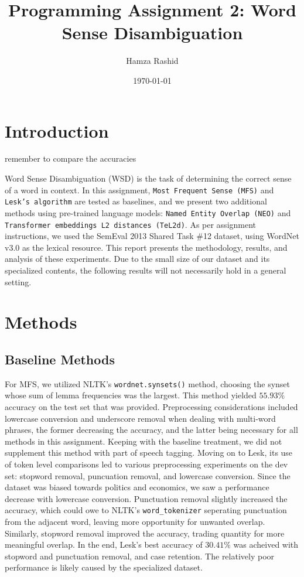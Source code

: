 \documentclass[11pt]{article}
\title{Programming Assignment 2: Word Sense Disambiguation}
\author{Hamza Rashid}
\date{\today}
\begin{document}
\maketitle

\section{Introduction}
remember to compare the accuracies

Word Sense Disambiguation (WSD) is the task of determining the correct sense of a word in context. 
In this assignment, \texttt{Most Frequent Sense (MFS)} and \texttt{Lesk’s algorithm} are tested as baselines, and we present
two additional methods using pre-trained language models: \texttt{Named Entity Overlap (NEO)} and \texttt{Transformer embeddings L2 distances (TeL2d)}.
As per assignment instructions, we used the SemEval 2013 Shared Task \#12 dataset, 
using WordNet v3.0 as the lexical resource. 
This report presents the methodology, results, and analysis of these experiments.
Due to the small size of our dataset 
and its specialized contents, the following results will not necessarily hold in a general setting.

\section{Methods}
\subsection{Baseline Methods}
For MFS, we utilized NLTK's \texttt{wordnet.synsets()} method, choosing the synset whose sum of 
lemma frequencies was the largest. This method yielded $55.93\%$ accuracy on the test set that was provided. 
Preprocessing considerations included lowercase conversion and underscore removal when dealing with multi-word phrases,
the former decreasing the accuracy, and the latter being necessary for all methods in this assignment. 
Keeping with the baseline treatment, we did not supplement this method with part of speech tagging.
Moving on to Lesk, its use of token level comparisons led to various preprocessing experiments on the dev set: stopword removal, puncuation removal, and lowercase conversion. 
Since the dataset was biased towards politics and economics, we saw a performance decrease with lowercase conversion. Punctuation removal 
slightly increased the accuracy, which could owe to NLTK's \texttt{word\_tokenizer} seperating 
punctuation from the adjacent word, leaving more opportunity for unwanted overlap. 
Similarly, stopword removal improved the accuracy, trading quantity for more meaningful overlap.
In the end, Lesk's best accuracy of $30.41\%$ was acheived with stopword and punctuation removal,
and case retention. The relatively poor performance is likely caused by the specialized dataset. 
\end{document}
